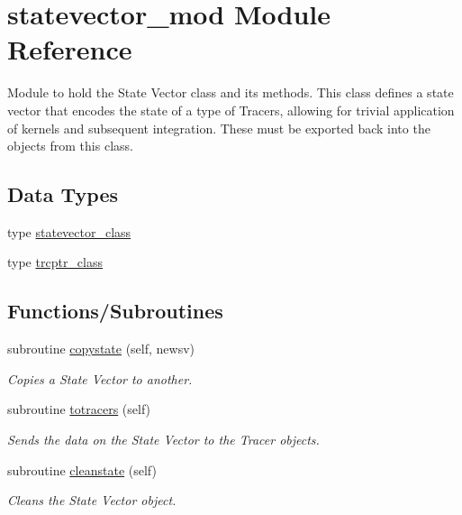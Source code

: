 \hypertarget{namespacestatevector__mod}{}\section{statevector\+\_\+mod Module Reference}
\label{namespacestatevector__mod}


Module to hold the State Vector class and its methods. This class defines a state vector that encodes the state of a type of Tracers, allowing for trivial application of kernels and subsequent integration. These must be exported back into the objects from this class.  


\subsection*{Data Types}
\begin{DoxyCompactItemize}
\item 
type \mbox{\hyperlink{structstatevector__mod_1_1statevector__class}{statevector\+\_\+class}}
\item 
type \mbox{\hyperlink{structstatevector__mod_1_1trcptr__class}{trcptr\+\_\+class}}
\end{DoxyCompactItemize}
\subsection*{Functions/\+Subroutines}
\begin{DoxyCompactItemize}
\item 
subroutine \mbox{\hyperlink{namespacestatevector__mod_afb7f6650aedee27644d33416d3a49fc0}{copystate}} (self, newsv)
\begin{DoxyCompactList}\small\item\em Copies a State Vector to another. \end{DoxyCompactList}\item 
subroutine \mbox{\hyperlink{namespacestatevector__mod_af0831dbae02e8ec94c576224cae673e5}{totracers}} (self)
\begin{DoxyCompactList}\small\item\em Sends the data on the State Vector to the Tracer objects. \end{DoxyCompactList}\item 
subroutine \mbox{\hyperlink{namespacestatevector__mod_acb2d2a7c4c5ee5d86a601be7db58c1df}{cleanstate}} (self)
\begin{DoxyCompactList}\small\item\em Cleans the State Vector object. \end{DoxyCompactList}\end{DoxyCompactItemize}


